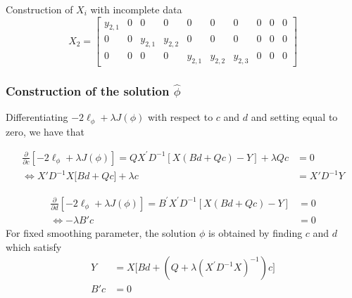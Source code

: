 \begin{example}{Construction of $X_i$ with incomplete data}
\begin{equation}
X_2 =  \begin{bmatrix} 
y_{2, 1}  & 	0  &	  0           &    0            &    0   & 0 & 0 & 0 & 0 & 0  \\
0   	      &  	0  &	y_{2, 1}  &    y_{2,2}   &    0   &  0 & 0 & 0 & 0 & 0 \\
 0   	      &        0  &    0           &    0            &  y_{2, 1}    & y_{2, 2}& y_{2, 3} &    0   & 0  & 0
\end{bmatrix}
\end{equation}
\end{example}

\subsubsection{Construction of the solution $\hat{\phi}$}

Differentiating $-2\ell_\phi + \lambda J\left(\phi\right)$ with respect to $c$ and $d$ and setting equal to zero, we have that 

\begin{align}
\frac{\partial}{\partial c}\left[-2\ell_\phi + \lambda J\left(\phi\right)\right] = Q X^\prime D^{-1}\left[ X\left(Bd + Qc\right) - Y  \right] + \lambda Qc &= 0 \nonumber \\
\iff    X'D^{-1} X \bigg[ Bd + Qc \bigg] + \lambda c  &= X' D^{-1}Y \label{eq:normal-eq-1}
\end{align}

\begin{align}
\frac{\partial}{\partial d}\left[-2\ell_\phi + \lambda J\left(\phi\right)\right] = B^\prime X^\prime D^{-1}\left[ X\left(Bd + Qc\right) - Y  \right] &=0 \nonumber \\
\iff   - \lambda B' c  &= 0  
\end{align}
\bigskip
\noindent
For fixed smoothing parameter, the solution $\phi$ is obtained by finding $c$ and $d$ which satisfy
\begin{align} 
Y &= X \bigg[ Bd + \left(Q  + \lambda \left(X^\prime D^{-1} X \right)^{-1} \right) c \bigg] \label{eq:ssanova-normal-eq-1} \\
B' c  &= 0  \label{eq:ssanova-normal-eq-2}
\end{align}
\noindent






